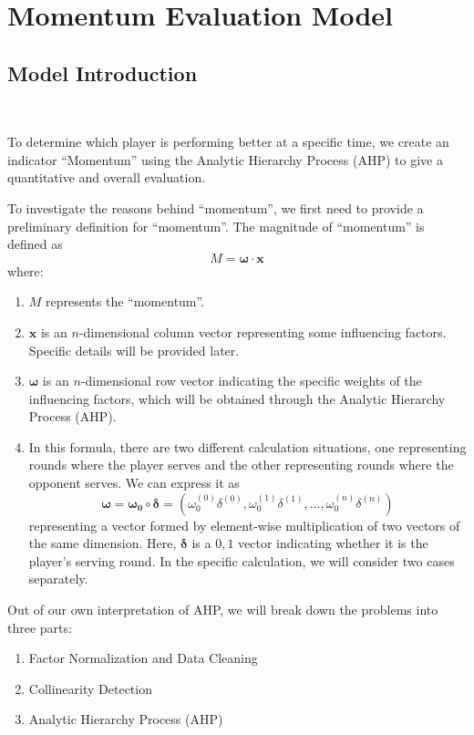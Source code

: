 \section{Momentum Evaluation Model}

\subsection{Model Introduction}~{}

To determine which player is performing better at a specific time, we create an indicator ``Momentum'' 
using the Analytic Hierarchy Process (AHP) to give a quantitative and overall evaluation.

\indent To investigate the reasons behind ``momentum'', we first need to provide a preliminary definition for ``momentum''. The magnitude of ``momentum'' is defined as 
$$M=\boldsymbol{\omega}\cdot\boldsymbol{x}$$
where:
\begin{enumerate}
    \item $M$ represents the ``momentum''.
    \item $\boldsymbol{x}$ is an $n$-dimensional column vector representing some influencing factors. Specific details will be provided later.
    \item $\boldsymbol{\omega}$ is an $n$-dimensional row vector indicating the specific weights of the influencing factors, which will be obtained through the Analytic Hierarchy Process (AHP).
    \item In this formula, there are two different calculation situations, one representing rounds where the player serves and the other representing rounds where the opponent serves. We can express it as $$\boldsymbol{\omega}=\boldsymbol{\omega_0} \circ \boldsymbol{\delta}=(\omega_0^{(0)}\delta^{(0)},\omega_0^{(1)}\delta^{(1)},\dots,\omega_0^{(n)}\delta^{(n)})$$ representing a vector formed by element-wise multiplication of two vectors of the same dimension. Here, $\boldsymbol{\delta}$ is a $0,1$ vector indicating whether it is the player's serving round. In the specific calculation, we will consider two cases separately.
\end{enumerate}

Out of our own interpretation of AHP, we will break down the problems into three parts:

\begin{enumerate}
    \item Factor Normalization and Data Cleaning
    \item Collinearity Detection
    \item Analytic Hierarchy Process (AHP)
\end{enumerate}

